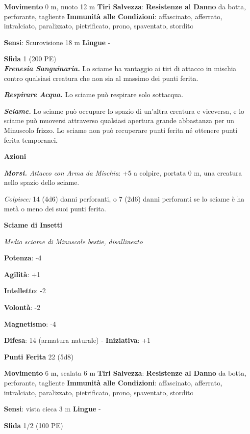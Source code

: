 \begin{multicols}{2}
\textbf{Movimento} 0 m, nuoto 12 m
\textbf{Tiri Salvezza}:
\textbf{Resistenze al Danno} da botta, perforante, tagliente
\textbf{Immunità alle Condizioni}: affascinato, afferrato, intralciato,
paralizzato, pietrificato, prono, spaventato, stordito

\textbf{Sensi}: Scurovisione 18 m
\textbf{Lingue} -

\textbf{Sfida} 1 (200 PE)\smallskip\\

\emph{\textbf{Frenesia Sanguinaria.}} Lo sciame ha vantaggio ai tiri di
attacco in mischia contro qualsiasi creatura che non sia al massimo dei
punti ferita.

\emph{\textbf{Respirare Acqua.}} Lo sciame può respirare solo sottacqua.

\emph{\textbf{Sciame.}} Lo sciame può occupare lo spazio di un'altra
creatura e viceversa, e lo sciame può muoversi attraverso qualsiasi
apertura grande abbastanza per un Minuscolo frizzo. Lo sciame non può
recuperare punti ferita né ottenere punti ferita temporanei.

\smallskip\textbf{Azioni}

\emph{\textbf{Morsi.} Attacco con Arma da Mischia}: +5 a colpire,
portata 0 m, una creatura nello spazio dello sciame.

\emph{Colpisce:} 14 (4d6) danni perforanti, o 7 (2d6) danni perforanti
se lo sciame è ha metà o meno dei suoi punti ferita.

\textbf{Sciame di Insetti}

\emph{Medio sciame di Minuscole bestie, disallineato}

\textbf{Potenza}: -4

\textbf{Agilità}: +1

\textbf{Intelletto}: -2

\textbf{Volontà}: -2

\textbf{Magnetismo}: -4

\textbf{Difesa}: 14 (armatura naturale) - \textbf{Iniziativa}: +1

\textbf{Punti Ferita} 22 (5d8)

\textbf{Movimento} 6 m, scalata 6 m
\textbf{Tiri Salvezza}:
\textbf{Resistenze al Danno} da botta, perforante, tagliente
\textbf{Immunità alle Condizioni}: affascinato, afferrato, intralciato,
paralizzato, pietrificato, prono, spaventato, stordito

\textbf{Sensi}: vista cieca 3 m \textbf{Lingue} -

\textbf{Sfida} 1/2 (100 PE)\smallskip\\


\end{multicols}
